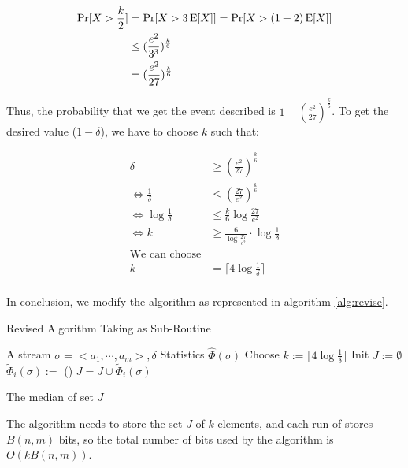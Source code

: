 \begin{equation*}
  \begin{aligned}
    \Pr[X > \frac{k}{2}] &= \Pr[X > 3\operatorname{E}[X]] = \Pr[X > (1 + 2)\operatorname{E}[X]] \\
    &\leq (\frac{e^2}{3^3})^{\frac{k}{6}} \\
    &= (\frac{e^2}{27})^{\frac{k}{6}} \\
  \end{aligned}
\end{equation*}

Thus, the probability that we get the event described is $1 - (\frac{e^2}{27})^{\frac{k}{6}}$. To get the desired value ($1 - \delta$), we have to choose $k$ such that:

\begin{equation*}
  \begin{aligned}
    \delta &\geq (\frac{e^2}{27})^{\frac{k}{6}} \\
    \iff \frac{1}{\delta} &\leq (\frac{27}{e^2})^{\frac{k}{6}} \\
    \iff \log \frac{1}{\delta} &\leq \frac{k}{6} \log \frac{27}{e^2} \\
    \iff k &\geq \frac{6}{\log \frac{27}{e^2}} \cdot \log \frac{1}{\delta} \\
    \text{We can choose} \\
    k &= \lceil 4\log \frac{1}{\delta}\rceil \\
\end{aligned}
\end{equation*}

In conclusion, we modify the algorithm as represented in algorithm \ref{alg:revise}.

\begin{algorithm}
  \caption{Revised Algorithm Taking \alg as Sub-Routine}
  \label{alg:revise}
  \begin{algorithmic}
    \Require A stream $\sigma = <a_1, \cdots, a_m>, \delta$
    \Ensure Statistics $\widehat{\Phi}(\sigma)$
    \renewcommand{\algorithmicrequire}{\textbf{Input:}}
    \renewcommand{\algorithmicensure}{\textbf{Output:}}
    \algnewcommand{}
    \algnewcommand\Operation{\item[\algorithmicoperation]}
    \Operation
    \State Choose $k := \lceil 4\log \frac{1}{\delta}\rceil$
    \State Init $J := \emptyset$
    \State $\widetilde{\Phi}_i(\sigma) :=$ \alg()
    \State $J = J \cup \widetilde{\Phi}_i(\sigma)$ 
    \EndFor

    \Return The median of set $J$
  \end{algorithmic}
\end{algorithm}

The algorithm needs to store the set $J$ of $k$ elements, and each run of \alg stores $B(n,m)$ bits, so the total number of bits used by the algorithm is $O(kB(n,m))$.
